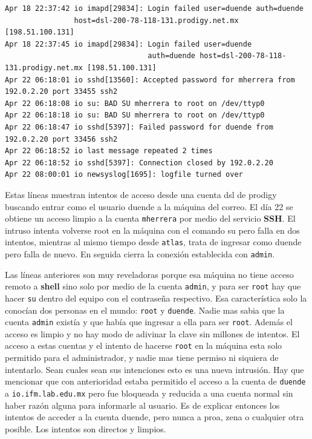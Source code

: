 \begin{lstlisting}[style=terminal] 
Apr 18 22:37:42 io imapd[29834]: Login failed user=duende auth=duende 
                host=dsl-200-78-118-131.prodigy.net.mx [198.51.100.131]
Apr 18 22:37:45 io imapd[29834]: Login failed user=duende 
                                 auth=duende host=dsl-200-78-118-131.prodigy.net.mx [198.51.100.131]
Apr 22 06:18:01 io sshd[13560]: Accepted password for mherrera from 192.0.2.20 port 33455 ssh2
Apr 22 06:18:08 io su: BAD SU mherrera to root on /dev/ttyp0
Apr 22 06:18:18 io su: BAD SU mherrera to root on /dev/ttyp0
Apr 22 06:18:47 io sshd[5397]: Failed password for duende from 192.0.2.20 port 33456 ssh2
Apr 22 06:18:52 io last message repeated 2 times
Apr 22 06:18:52 io sshd[5397]: Connection closed by 192.0.2.20
Apr 22 08:00:01 io newsyslog[1695]: logfile turned over
\end{lstlisting}

\vspace{1em}

Estas líneas muestran intentos de acceso desde una cuenta dsl de
prodigy buscando entrar como el usuario duende a la máquina del
correo. El día 22 se obtiene un acceso limpio a la cuenta \texttt{mherrera} por
medio del servicio \textbf{SSH}. El intruso intenta volverse root en la máquina
con el comando su pero falla en dos intentos, mientras al mismo tiempo
desde \texttt{atlas}, trata de ingresar como duende pero falla de nuevo. En seguida
cierra la conexión establecida con \texttt{admin}.

Las líneas anteriores son muy reveladoras porque esa máquina no tiene
acceso remoto a \textbf{shell} sino solo por medio de la cuenta \texttt{admin}, 
y para ser \texttt{root} hay que
hacer \texttt{su} dentro del equipo con el contraseña respectivo. Esa
característica solo la conocían dos personas en el mundo: \texttt{root} y
\texttt{duende}. Nadie mas sabia que la cuenta \texttt{admin} existía y que había que
ingresar a ella para ser \texttt{root}. Además el acceso es limpio y no hay
modo de adivinar la clave sin millones de intentos. El acceso a estas
cuentas y el intento de hacerse \texttt{root} en la máquina esta solo permitido
para el administrador, y nadie mas tiene permiso ni siquiera de intentarlo. Sean
cuales sean sus intenciones esto es una nueva intrusión. Hay que mencionar
que con anterioridad estaba permitido el acceso a la cuenta de
\texttt{duende} a \texttt{io.ifm.lab.edu.mx} pero fue bloqueada y reducida a una cuenta normal sin
haber razón alguna para informarle al usuario. Es de explicar
entonces los intentos de acceder a la cuenta duende, pero nunca a
proa, zena o cualquier otra posible. Los intentos son directos y
limpios.

